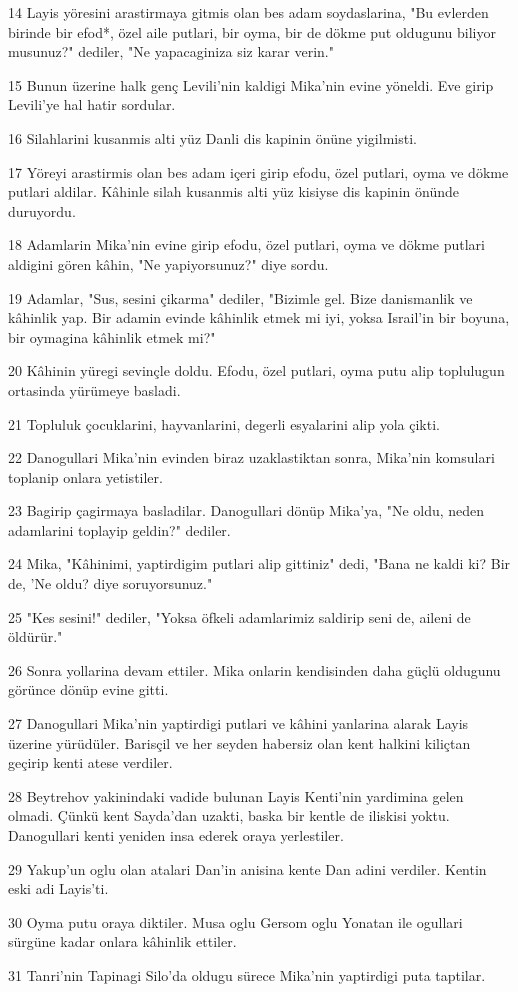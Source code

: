 \par 14 Layis yöresini arastirmaya gitmis olan bes adam soydaslarina, "Bu evlerden birinde bir efod*, özel aile putlari, bir oyma, bir de dökme put oldugunu biliyor musunuz?" dediler, "Ne yapacaginiza siz karar verin."
\par 15 Bunun üzerine halk genç Levili'nin kaldigi Mika'nin evine yöneldi. Eve girip Levili'ye hal hatir sordular.
\par 16 Silahlarini kusanmis alti yüz Danli dis kapinin önüne yigilmisti.
\par 17 Yöreyi arastirmis olan bes adam içeri girip efodu, özel putlari, oyma ve dökme putlari aldilar. Kâhinle silah kusanmis alti yüz kisiyse dis kapinin önünde duruyordu.
\par 18 Adamlarin Mika'nin evine girip efodu, özel putlari, oyma ve dökme putlari aldigini gören kâhin, "Ne yapiyorsunuz?" diye sordu.
\par 19 Adamlar, "Sus, sesini çikarma" dediler, "Bizimle gel. Bize danismanlik ve kâhinlik yap. Bir adamin evinde kâhinlik etmek mi iyi, yoksa Israil'in bir boyuna, bir oymagina kâhinlik etmek mi?"
\par 20 Kâhinin yüregi sevinçle doldu. Efodu, özel putlari, oyma putu alip toplulugun ortasinda yürümeye basladi.
\par 21 Topluluk çocuklarini, hayvanlarini, degerli esyalarini alip yola çikti.
\par 22 Danogullari Mika'nin evinden biraz uzaklastiktan sonra, Mika'nin komsulari toplanip onlara yetistiler.
\par 23 Bagirip çagirmaya basladilar. Danogullari dönüp Mika'ya, "Ne oldu, neden adamlarini toplayip geldin?" dediler.
\par 24 Mika, "Kâhinimi, yaptirdigim putlari alip gittiniz" dedi, "Bana ne kaldi ki? Bir de, 'Ne oldu? diye soruyorsunuz."
\par 25 "Kes sesini!" dediler, "Yoksa öfkeli adamlarimiz saldirip seni de, aileni de öldürür."
\par 26 Sonra yollarina devam ettiler. Mika onlarin kendisinden daha güçlü oldugunu görünce dönüp evine gitti.
\par 27 Danogullari Mika'nin yaptirdigi putlari ve kâhini yanlarina alarak Layis üzerine yürüdüler. Barisçil ve her seyden habersiz olan kent halkini kiliçtan geçirip kenti atese verdiler.
\par 28 Beytrehov yakinindaki vadide bulunan Layis Kenti'nin yardimina gelen olmadi. Çünkü kent Sayda'dan uzakti, baska bir kentle de iliskisi yoktu. Danogullari kenti yeniden insa ederek oraya yerlestiler.
\par 29 Yakup'un oglu olan atalari Dan'in anisina kente Dan adini verdiler. Kentin eski adi Layis'ti.
\par 30 Oyma putu oraya diktiler. Musa oglu Gersom oglu Yonatan ile ogullari sürgüne kadar onlara kâhinlik ettiler.
\par 31 Tanri'nin Tapinagi Silo'da oldugu sürece Mika'nin yaptirdigi puta taptilar.

